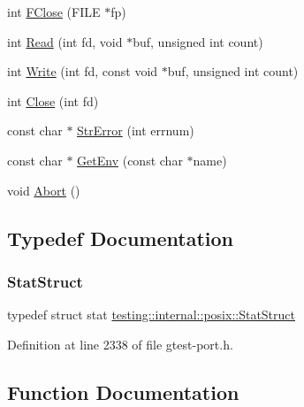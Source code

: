 \begin{DoxyCompactItemize}
\item 
int \hyperlink{namespacetesting_1_1internal_1_1posix_af4beeaaa8d62916d5e3b644a1ddfbd6b}{F\+Close} (F\+I\+LE $\ast$fp)
\item 
int \hyperlink{namespacetesting_1_1internal_1_1posix_a3c6ab13e581a56f1b02f3eb7536c97fd}{Read} (int fd, void $\ast$buf, unsigned int count)
\item 
int \hyperlink{namespacetesting_1_1internal_1_1posix_af4acf9f78d55f815a18b43786511abef}{Write} (int fd, const void $\ast$buf, unsigned int count)
\item 
int \hyperlink{namespacetesting_1_1internal_1_1posix_a15e5b8f2a535ef1b2529b85b861e4846}{Close} (int fd)
\item 
const char $\ast$ \hyperlink{namespacetesting_1_1internal_1_1posix_a4b77b14af6f4d18f83d303b98e9349c4}{Str\+Error} (int errnum)
\item 
const char $\ast$ \hyperlink{namespacetesting_1_1internal_1_1posix_a1d5e3da5a27eed25986859fa83cafe95}{Get\+Env} (const char $\ast$name)
\item 
void \hyperlink{namespacetesting_1_1internal_1_1posix_a69b8278c59359dd6a6f941b4643db9fb}{Abort} ()
\end{DoxyCompactItemize}


\subsection{Typedef Documentation}
\mbox{\label{namespacetesting_1_1internal_1_1posix_a8eb9f08d3af29941c2d2a964cfff3ecb}} 
\subsubsection{\texorpdfstring{Stat\+Struct}{StatStruct}}
{\footnotesize\ttfamily typedef struct stat \hyperlink{namespacetesting_1_1internal_1_1posix_a8eb9f08d3af29941c2d2a964cfff3ecb}{testing\+::internal\+::posix\+::\+Stat\+Struct}}



Definition at line 2338 of file gtest-\/port.\+h.



\subsection{Function Documentation}
\mbox{\label{namespacetesting_1_1internal_1_1posix_a69b8278c59359dd6a6f941b4643db9fb}} 
